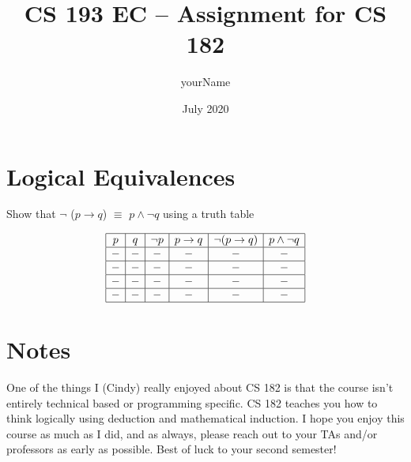 \documentclass{article}
\title{CS 193 EC – Assignment for CS 182}
\author{yourName }
\date{July 2020}
\begin{document}
\maketitle

\section{Logical Equivalences}
\begin{center}
 Show that  $\neg $ ($p \to q$) $\equiv $ $p \land \neg q$ using a truth table
\end{center}

\begin{displaymath}  %
  \begin{array}{|c|c|c|c|c|c|}\hline
    
    p & q & \neg p  & p \to q & \neg (p \to q) & p \land \neg q \\\hline
    - & - & - & - & \mathbf{-} & \mathbf{-} \\\hline
    - & - & - & - & \mathbf{-} & \mathbf{-}  \\\hline
    - & - & - & - & \mathbf{-} & \mathbf{-}  \\\hline
    - & - & - & - & \mathbf{-} & \mathbf{-}  \\\hline

  \end{array}
\end{displaymath}

\section{Notes}
\begin{flushleft}
One of the things I (Cindy) really enjoyed about CS 182 is that the course isn't entirely technical based or programming specific. CS 182 teaches you how to think logically using deduction and mathematical induction. I hope you enjoy this course as much as I did, and as always, please reach out to your TAs and/or professors as early as possible. Best of luck to your second semester!
\end{flushleft}
\end{document}
